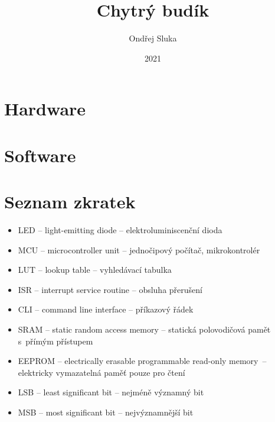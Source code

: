 \documentclass[12pt,a4paper]{article}
\title{Chytrý budík}
\author{Ondřej Sluka}
\date{2021}  %
\begin{document}
\maketitle  %

\tableofcontents



\clearpage
\section{Hardware} %
%

\clearpage
\section{Software}  %


\printbibliography[title={Odkazy a~literatura}]  %


\section*{Seznam zkratek}
\begin{itemize}
    \item LED -- light-emitting diode -- elektroluminiscenční dioda
    \item MCU -- microcontroller unit -- jednočipový počítač, mikrokontrolér
    \item LUT -- lookup table -- vyhledávací tabulka
    \item ISR -- interrupt service routine -- obsluha přerušení
    \item CLI -- command line interface -- příkazový řádek
    \item SRAM -- static random access memory -- statická polovodičová pamět
          s~přímým přístupem
    \item EEPROM -- electrically erasable programmable read-only memory~--
          elektricky vymazatelná paměť pouze pro čtení
    \item LSB -- least significant bit -- nejméně významný bit
    \item MSB -- most significant bit -- nejvýznamnější bit
\end{itemize}
\end{document}
